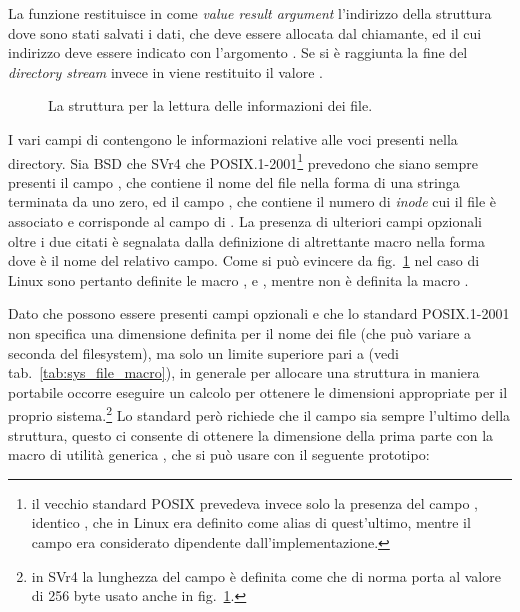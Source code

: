 La funzione restituisce in  come \textit{value result argument}
l'indirizzo della struttura  dove sono stati salvati i dati,
che deve essere allocata dal chiamante, ed il cui indirizzo deve essere
indicato con l'argomento .  Se si è raggiunta la fine del
\textit{directory stream} invece in  viene restituito il valore
.

\begin{figure}[!htb]
  \footnotesize \centering
  \begin{minipage}[c]{0.8\textwidth}
  \end{minipage} 
  \normalsize 
  \caption{La struttura  per la lettura delle informazioni dei 
    file.}
  \label{fig:file_dirent_struct}
\end{figure}



I vari campi di  contengono le informazioni relative alle voci
presenti nella directory. Sia BSD che SVr4 che POSIX.1-2001\footnote{il
  vecchio standard POSIX prevedeva invece solo la presenza del campo
  , identico , che in Linux era definito come alias
  di quest'ultimo, mentre il campo  era considerato dipendente
  dall'implementazione.}  prevedono che siano sempre presenti il campo
, che contiene il nome del file nella forma di una stringa
terminata da uno zero, ed il campo , che contiene il numero di
\textit{inode} cui il file è associato e corrisponde al campo  di
.  La presenza di ulteriori campi opzionali oltre i due citati è
segnalata dalla definizione di altrettante macro nella forma
 dove  è il nome del relativo
campo. Come si può evincere da fig.~\ref{fig:file_dirent_struct} nel caso di
Linux sono pertanto definite le macro ,
 e , mentre non
è definita la macro .

Dato che possono essere presenti campi opzionali e che lo standard
POSIX.1-2001 non specifica una dimensione definita per il nome dei file (che
può variare a seconda del filesystem), ma solo un limite superiore pari a
 (vedi tab.~\ref{tab:sys_file_macro}), in generale per
allocare una struttura  in maniera portabile occorre eseguire
un calcolo per ottenere le dimensioni appropriate per il proprio
sistema.\footnote{in SVr4 la lunghezza del campo è definita come
   che di norma porta al valore di 256 byte usato anche in
  fig.~\ref{fig:file_dirent_struct}.} Lo standard però richiede che il campo
 sia sempre l'ultimo della struttura, questo ci consente di
ottenere la dimensione della prima parte con la macro di utilità generica
, che si può usare con il seguente prototipo:

